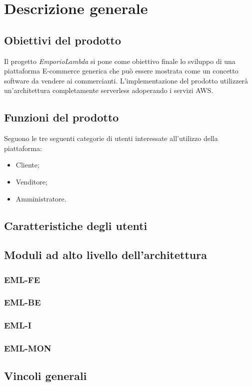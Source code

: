 \section{Descrizione generale}
\subsection{Obiettivi del prodotto}
Il progetto \textit{EmporioLambda} si pone come obiettivo finale lo sviluppo di una piattaforma E-commerce generica che può essere mostrata come un concetto software da vendere ai commercianti. L'implementazione del prodotto utilizzerà un'architettura completamente serverless adoperando i servizi AWS.
\subsection{Funzioni del prodotto}
Seguono le tre seguenti categorie di utenti interessate all'utilizzo della piattaforma:
\begin{itemize}
\item Cliente;
\item Venditore;
\item Amministratore.
\end{itemize}

\subsection{Caratteristiche degli utenti}

\subsection{Moduli ad alto livello dell'architettura}
\subsubsection{EML-FE}
\subsubsection{EML-BE}
\subsubsection{EML-I}
\subsubsection{EML-MON}
\subsection{Vincoli generali}